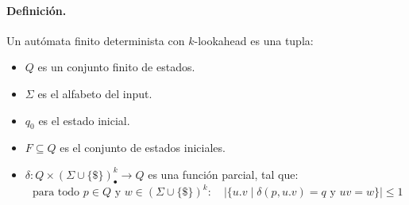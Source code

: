 \paragraph{Definición.} Un autómata finito determinista con $k$-lookahead es una tupla:
\begin{itemize}
    \item $Q$ es un conjunto finito de estados.
    \item $\Sigma$ es el alfabeto del input.
    \item $q_0$ es el estado inicial.
    \item $F \subseteq Q$ es el conjunto de estados iniciales.
    \item $\delta: Q \times(\Sigma \cup\{\mathbb{\$}\})_{\bullet}^k \rightarrow Q$ es una función parcial, tal que:
          $$
              \text { para todo } p \in Q \text { y } w \in(\Sigma \cup\{\$\})^k:\quad  |\{u . v \mid \delta(p, u.v)=q \text { y } u v=w\}| \leq 1
          $$
\end{itemize}

